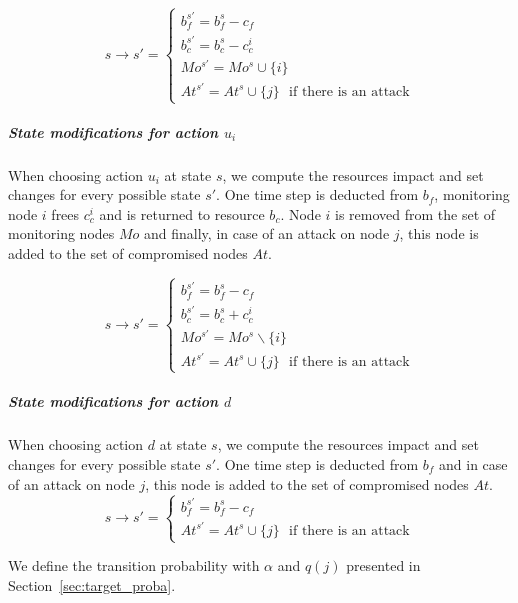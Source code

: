 \begin{equation}
  s \longrightarrow s' =\begin{cases}
    b_f^{s'} = b_f^s - c_f\\
    b_c^{s'} = b_c^s - c_c^i\\
    Mo^{s'} = Mo^s \cup \{i\}\\
    At^{s'} = At^s \cup \{j\} \text{~~if there is an attack}
  \end{cases}
\end{equation}

\subparagraph*{\textbf{State modifications for action $u_i$}}
When choosing action $u_i$ at state $s$, we compute the resources impact and set changes for every possible state $s'$. One time step is deducted from $b_f$, monitoring node $i$ frees $c_c^i$ and is returned to resource $b_c$. Node $i$ is removed from the set of monitoring nodes $Mo$ and finally, in case of an attack on node $j$, this node is added to the set of compromised nodes $At$.

\begin{equation}
  s \longrightarrow s' =\begin{cases}
    b_f^{s'} = b_f^s - c_f\\
    b_c^{s'} = b_c^s + c_c^i\\
    Mo^{s'} = Mo^s \backslash\{i\}\\
    At^{s'} = At^s \cup \{j\}\text{~~if there is an attack}
  \end{cases}
\end{equation}

\subparagraph*{\textbf{State modifications for action $d$}}
When choosing action $d$ at state $s$, we compute the resources impact and set changes for every possible state $s'$. One time step is deducted from $b_f$ and in case of an attack on node $j$, this node is added to the set of compromised nodes $At$.
\begin{equation}
  s \longrightarrow s' =\begin{cases}
    b_f^{s'} = b_f^s - c_f\\
    At^{s'} = At^s \cup \{j\}\text{~~if there is an attack}
  \end{cases}
\end{equation}


We define the transition probability with $\alpha$  and $q(j)$ presented in Section~\ref{sec:target_proba}.

